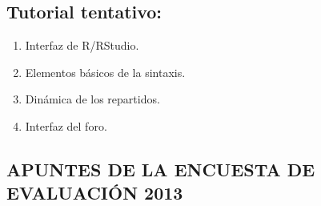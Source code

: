 \documentclass[]{article}
\begin{document}
\subsection{Tutorial tentativo:}

\begin{enumerate}[1.]
\item
  Interfaz de R/RStudio.
\item
  Elementos básicos de la sintaxis.
\item
  Dinámica de los repartidos.
\item
  Interfaz del foro.
\end{enumerate}
\subsection{APUNTES DE LA ENCUESTA DE EVALUACIÓN 2013}
\end{document}
